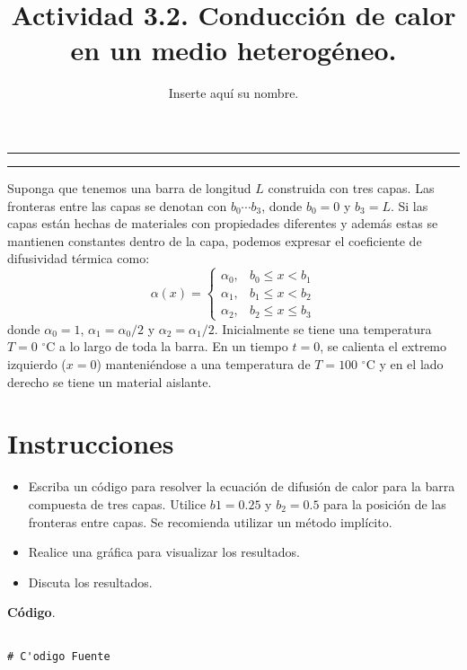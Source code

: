 \documentclass[11pt,a4paper]{article}
\title{Actividad 3.2. Conducción de calor en un medio heterogéneo.}
\author{Inserte aquí su nombre.}
\begin{document}
\hrule
\begin{center}


\bigskip
\hrule
\end{center}


Suponga que tenemos una barra de longitud $L$ construida con tres capas. Las fronteras entre las capas se denotan con $b_0 \cdots b_3$, donde $b_0 = 0$ y $b_3 = L$. Si las capas están hechas de materiales con propiedades diferentes y además estas se mantienen constantes dentro de la capa, podemos expresar el coeficiente de difusividad térmica como:
\begin{equation*}
\alpha(x)=\left\{\begin{array}{ll}
\alpha_0, & b_0 \leq x<b_1 \\
\alpha_1, & b_1 \leq x<b_2 \\
\alpha_2, & b_2 \leq x \leq b_3
\end{array}\right.
\end{equation*}
donde $\alpha_0 = 1$, $\alpha_1 = \alpha_0/2$ y $\alpha_2 = \alpha_1/2$.
Inicialmente se tiene una temperatura $T=0$ $^{\circ}$C a lo largo de toda la barra. En un tiempo $t=0$, se calienta el extremo izquierdo ($x=0$) manteniéndose a una temperatura de $T=100$ $^{\circ}$C y en el lado derecho se tiene un material aislante.

\section*{Instrucciones}

\begin{itemize}
\item Escriba un código para resolver la ecuación de difusión de calor para la barra compuesta de tres capas. Utilice $b1 = 0.25$ y $b_2 = 0.5$ para la posición de las fronteras entre capas. Se recomienda utilizar un método implícito.
\item Realice una gráfica para visualizar los resultados.
\item Discuta los resultados.
\end{itemize}

\newpage

\begin{tcolorbox}[colback=white]
\textbf{Código}.
\tcblower

\begin{lstlisting}

# C'odigo Fuente


\end{lstlisting}

\end{tcolorbox}
\end{document}
